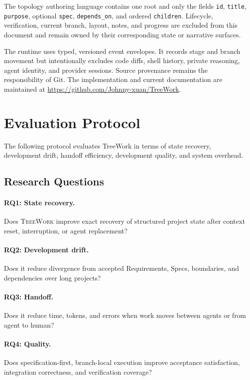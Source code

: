 \documentclass[11pt]{article}
\newcommand{\system}{\textsc{TreeWork}\xspace}
\theoremstyle{definition}
\begin{document}
The topology authoring language contains one root and only the fields
\texttt{id}, \texttt{title}, \texttt{purpose}, optional \texttt{spec},
\texttt{depends\_on}, and ordered \texttt{children}.  Lifecycle, verification,
current branch, layout, notes, and progress are excluded from this document and
remain owned by their corresponding state or narrative surfaces.

The runtime uses typed, versioned event envelopes.  It records stage and branch
movement but intentionally excludes code diffs, shell history, private
reasoning, agent identity, and provider sessions.  Source provenance remains
the responsibility of Git.  The implementation and current documentation are
maintained at
\url{https://github.com/Johnny-xuan/TreeWork}.

\section{Evaluation Protocol}
\label{sec:evaluation}

The following protocol evaluates TreeWork in terms of state recovery,
development drift, handoff efficiency, development quality, and system
overhead.

\subsection{Research Questions}

\paragraph{RQ1: State recovery.}
Does \system improve exact recovery of structured project state after context
reset, interruption, or agent replacement?

\paragraph{RQ2: Development drift.}
Does it reduce divergence from accepted Requirements, Specs, boundaries, and
dependencies over long projects?

\paragraph{RQ3: Handoff.}
Does it reduce time, tokens, and errors when work moves between agents or from
agent to human?

\paragraph{RQ4: Quality.}
Does specification-first, branch-local execution improve acceptance
satisfaction, integration correctness, and verification coverage?
\end{document}
